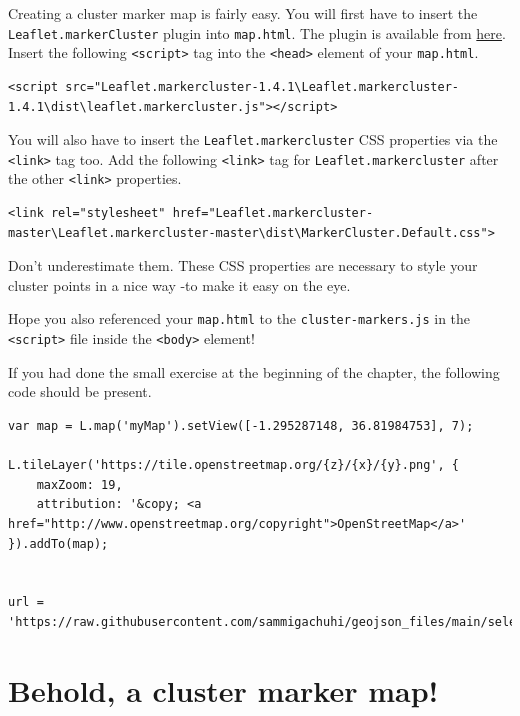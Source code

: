 \documentclass[
]{book}
\begin{document}
Creating a cluster marker map is fairly easy. You will first have to insert the \texttt{Leaflet.markerCluster} plugin into \texttt{map.html}. The plugin is available from \href{https://github.com/Leaflet/Leaflet.markercluster/archive/refs/heads/master.zip}{here}. Insert the following \texttt{\textless{}script\textgreater{}} tag into the \texttt{\textless{}head\textgreater{}} element of your \texttt{map.html}.

\begin{verbatim}
<script src="Leaflet.markercluster-1.4.1\Leaflet.markercluster-1.4.1\dist\leaflet.markercluster.js"></script>
\end{verbatim}

You will also have to insert the \texttt{Leaflet.markercluster} CSS properties via the \texttt{\textless{}link\textgreater{}} tag too. Add the following \texttt{\textless{}link\textgreater{}} tag for \texttt{Leaflet.markercluster} after the other \texttt{\textless{}link\textgreater{}} properties.

\begin{verbatim}
<link rel="stylesheet" href="Leaflet.markercluster-master\Leaflet.markercluster-master\dist\MarkerCluster.Default.css"> 
\end{verbatim}

Don't underestimate them. These CSS properties are necessary to style your cluster points in a nice way -to make it easy on the eye.

Hope you also referenced your \texttt{map.html} to the \texttt{cluster-markers.js} in the \texttt{\textless{}script\textgreater{}} file inside the \texttt{\textless{}body\textgreater{}} element!

If you had done the small exercise at the beginning of the chapter, the following code should be present.

\begin{verbatim}
var map = L.map('myMap').setView([-1.295287148, 36.81984753], 7);

L.tileLayer('https://tile.openstreetmap.org/{z}/{x}/{y}.png', {
    maxZoom: 19,
    attribution: '&copy; <a href="http://www.openstreetmap.org/copyright">OpenStreetMap</a>'
}).addTo(map);


url = 'https://raw.githubusercontent.com/sammigachuhi/geojson_files/main/selected_hospitals.json'
\end{verbatim}

\hypertarget{behold-a-cluster-marker-map}{%
\section{Behold, a cluster marker map!}\label{behold-a-cluster-marker-map}}
\end{document}
